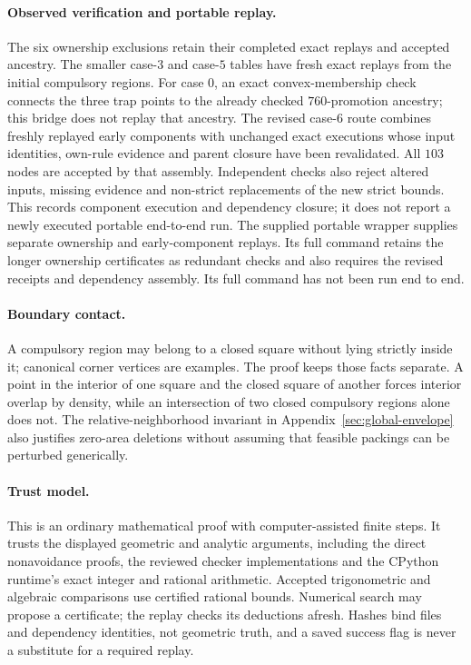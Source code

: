 \documentclass[11pt]{article}
\begin{document}
\paragraph{Observed verification and portable replay.}
The six ownership exclusions retain their completed exact replays and
accepted ancestry. The smaller case-$3$ and case-$5$ tables have fresh
exact replays from the initial compulsory regions. For case $0$, an exact
convex-membership check connects the three trap points to the already
checked $760$-promotion ancestry; this bridge does not replay that ancestry.
The revised case-$6$ route combines freshly replayed
early components with unchanged exact executions whose input identities,
own-rule evidence and parent closure have been revalidated. All $103$
nodes are accepted by that assembly. Independent checks also reject
altered inputs, missing evidence and non-strict replacements of the new
strict bounds. This records component execution and dependency closure;
it does not report a newly executed portable end-to-end run. The supplied
portable wrapper supplies separate ownership and early-component replays.
Its full command retains the longer ownership certificates as redundant
checks and also requires the revised receipts and dependency assembly.
Its full command has not been run end to end.

\paragraph{Boundary contact.}
A compulsory region may belong to a closed square without lying strictly
inside it; canonical corner vertices are examples. The proof keeps those
facts separate. A point in the interior of one square and the closed
square of another forces interior overlap by density, while an
intersection of two closed compulsory regions alone does not.
The relative-neighborhood invariant in
Appendix~\ref{sec:global-envelope} also justifies zero-area deletions
without assuming that feasible packings can be perturbed generically.

\paragraph{Trust model.}
This is an ordinary mathematical proof with computer-assisted finite
steps. It trusts the displayed geometric and analytic arguments, including
the direct nonavoidance proofs, the reviewed checker implementations and the CPython
runtime's exact integer and rational arithmetic. Accepted trigonometric
and algebraic comparisons use certified rational bounds. Numerical search
may propose a certificate; the replay checks its deductions afresh.
Hashes bind files and dependency identities, not geometric truth, and a
saved success flag is never a substitute for a required replay.
\end{document}
